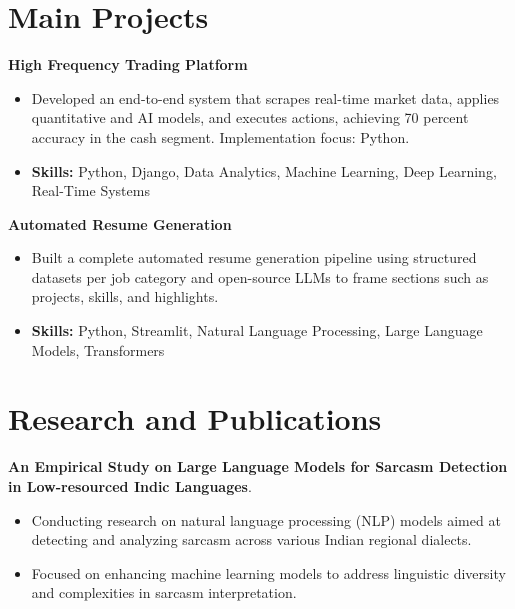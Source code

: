 \documentclass[a4paper,11pt]{article}
\begin{document}
\section{\textbf{Main Projects}}

\vspace{1mm}
  \textbf{High Frequency Trading Platform  }
\vspace{-1.5mm} %
\begin{itemize}
  \item Developed an end-to-end system that scrapes real-time market data, applies quantitative and AI models, and executes actions, achieving 70 percent accuracy in the cash segment. Implementation focus: Python.
\vspace{-3mm}
  \item \textbf{Skills:} Python, Django, Data Analytics, Machine Learning, Deep Learning, Real-Time Systems
\end{itemize}


\vspace{1mm}
   \textbf{Automated Resume Generation }
\vspace{-1.5mm} %
\begin{itemize}
  \item Built a complete automated resume generation pipeline using structured datasets per job category and open-source LLMs to frame sections such as projects, skills, and highlights.
\vspace{-3mm}
  \item \textbf{Skills:} Python, Streamlit, Natural Language Processing, Large Language Models, Transformers
\end{itemize}



\section{\textbf{Research and Publications} \hfill }
\vspace{1mm}
  \textbf{An Empirical Study on Large Language Models for Sarcasm Detection in Low-resourced Indic Languages}.
\vspace{-1mm} %
\begin{itemize}
  \item Conducting research on natural language processing (NLP) models aimed at detecting and analyzing sarcasm across various Indian regional dialects.
\vspace{-3mm}
  \item Focused on enhancing machine learning models to address linguistic diversity and complexities in sarcasm interpretation.
\end{itemize}
\end{document}
